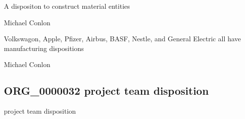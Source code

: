 \documentclass[letterpaper,10pt,english]{sphinxmanual}
\begin{document}
\begin{sphinxShadowBox}

\sphinxAtStartPar
A dispositon to construct material entities
\end{sphinxShadowBox}

\begin{sphinxShadowBox}

\sphinxAtStartPar
Michael Conlon 
\end{sphinxShadowBox}

\begin{sphinxShadowBox}

\sphinxAtStartPar
Volkswagon, Apple, Pfizer, Airbus, BASF, Nestle, and General Electric all have manufacturing dispositions
\end{sphinxShadowBox}

\begin{sphinxShadowBox}

\sphinxAtStartPar
{}
\end{sphinxShadowBox}

\begin{sphinxShadowBox}

\sphinxAtStartPar
Michael Conlon 
\end{sphinxShadowBox}

\begin{sphinxShadowBox}

\sphinxAtStartPar
{}
\end{sphinxShadowBox}
\begin{quote}

\ignorespaces \end{quote}


\subsection{ORG\_0000032 \sphinxhyphen{} project team disposition}
\label{\detokenize{doc-ORG_0000032:org-0000032-project-team-disposition}}\label{\detokenize{doc-ORG_0000032:index-0}}\label{\detokenize{doc-ORG_0000032::doc}}
\begin{sphinxShadowBox}

\sphinxAtStartPar
project team disposition
\end{sphinxShadowBox}
\end{document}
